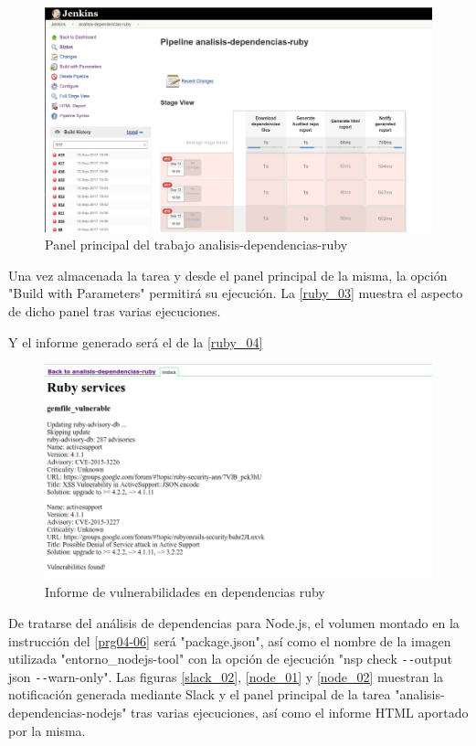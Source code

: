 \begin{figure}[htbp]
	\centering
	\includegraphics[width=1.0\linewidth]
	{desarrollo/figuras/ruby_03.png}
	\caption{Panel principal del trabajo analisis-dependencias-ruby}
	\label{ruby_03}
\end{figure}

Una vez almacenada la tarea y desde el panel principal de la misma, la opción "Build with Parameters" permitirá su ejecución. La \autoref{ruby_03} muestra el aspecto de dicho panel tras varias ejecuciones.

Y el informe generado será el de la \autoref{ruby_04}

\begin{figure}[H]
	\centering
	\includegraphics[width=1.00\linewidth]
	{desarrollo/figuras/ruby_04.png}
	\caption{Informe de vulnerabilidades en dependencias ruby}
	\label{ruby_04}
\end{figure}

De tratarse del análisis de dependencias para Node.js, el volumen montado en la instrucción del \autoref{prg04-06} será "package.json", así como el nombre de la imagen utilizada "entorno\_nodejs-tool" con la opción de ejecución "nsp check \texttt{-{}-}output json \texttt{-{}-}warn-only". Las figuras \ref{slack_02}, \ref{node_01} y \ref{node_02} muestran la notificación generada mediante Slack y el panel principal de la tarea "analisis-dependencias-nodejs" tras varias ejecuciones, así como el informe HTML aportado por la misma. 

